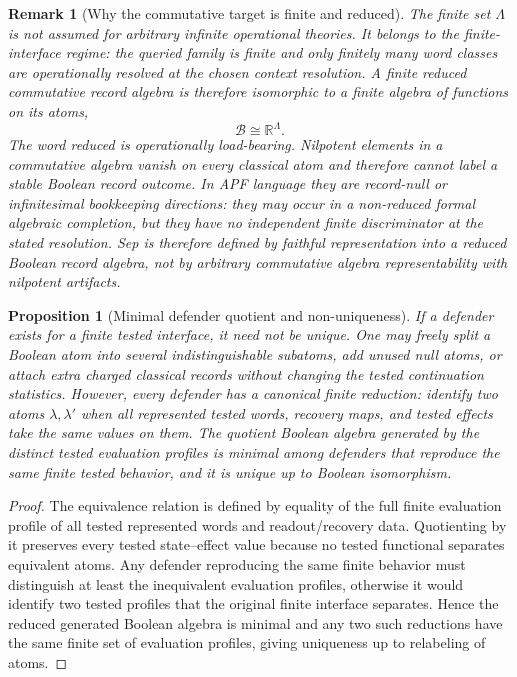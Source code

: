\documentclass[11pt]{article}
\newtheorem{proposition}[theorem]{Proposition}
\newtheorem{remark}[theorem]{Remark}
\newcommand{\R}{\mathbb R}
\begin{document}
\begin{remark}[Why the commutative target is finite and reduced]\label{rem:finite-lambda}
The finite set $\Lambda$ is not assumed for arbitrary infinite operational theories.  It belongs to the finite-interface regime: the queried family is finite and only finitely many word classes are operationally resolved at the chosen context resolution.  A finite reduced commutative record algebra is therefore isomorphic to a finite algebra of functions on its atoms,
\[
 \mathcal B \cong \R^\Lambda .
\]
The word \emph{reduced} is operationally load-bearing.  Nilpotent elements in a commutative algebra vanish on every classical atom and therefore cannot label a stable Boolean record outcome.  In APF language they are record-null or infinitesimal bookkeeping directions: they may occur in a non-reduced formal algebraic completion, but they have no independent finite discriminator at the stated resolution.  Sep is therefore defined by faithful representation into a reduced Boolean record algebra, not by arbitrary commutative algebra representability with nilpotent artifacts.
\end{remark}

\begin{proposition}[Minimal defender quotient and non-uniqueness]
\label{prop:minimal-defender-quotient}
If a defender exists for a finite tested interface, it need not be unique.  One may freely split a Boolean atom into several indistinguishable subatoms, add unused null atoms, or attach extra charged classical records without changing the tested continuation statistics.  However, every defender has a canonical finite reduction: identify two atoms \(\lambda,\lambda'\) when all represented tested words, recovery maps, and tested effects take the same values on them.  The quotient Boolean algebra generated by the distinct tested evaluation profiles is minimal among defenders that reproduce the same finite tested behavior, and it is unique up to Boolean isomorphism.
\end{proposition}
\begin{proof}
The equivalence relation is defined by equality of the full finite evaluation profile of all tested represented words and readout/recovery data.  Quotienting by it preserves every tested state--effect value because no tested functional separates equivalent atoms.  Any defender reproducing the same finite behavior must distinguish at least the inequivalent evaluation profiles, otherwise it would identify two tested profiles that the original finite interface separates.  Hence the reduced generated Boolean algebra is minimal and any two such reductions have the same finite set of evaluation profiles, giving uniqueness up to relabeling of atoms.
\end{proof}
\end{document}
